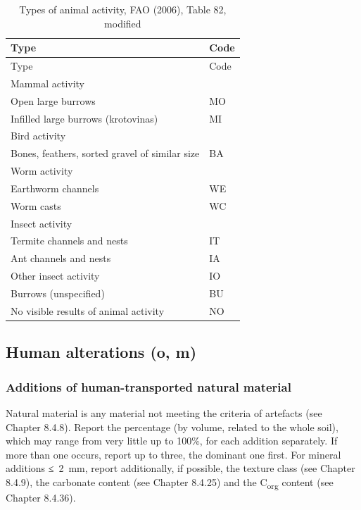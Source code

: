 \documentclass[
  letterpaper,
  DIV=11,
  numbers=noendperiod]{scrreprt}
\begin{document}
\begin{longtable}[]{@{}ll@{}}
\caption{Types of animal activity, FAO (2006), Table 82,
modified}\tabularnewline
\toprule()
Type & Code \\
\midrule()
\endfirsthead
\toprule()
Type & Code \\
\midrule()
\endhead
Mammal activity & \\
Open large burrows & MO \\
Infilled large burrows (krotovinas) & MI \\
Bird activity & \\
Bones, feathers, sorted gravel of similar size & BA \\
Worm activity & \\
Earthworm channels & WE \\
Worm casts & WC \\
Insect activity & \\
Termite channels and nests & IT \\
Ant channels and nests & IA \\
Other insect activity & IO \\
Burrows (unspecified) & BU \\
No visible results of animal activity & NO \\
\bottomrule()
\end{longtable}

\hypertarget{human-alterations-o-m}{%
\subsection{Human alterations (o, m)}\label{human-alterations-o-m}}

\hypertarget{additions-of-human-transported-natural-material}{%
\subsubsection{Additions of human-transported natural
material}\label{additions-of-human-transported-natural-material}}

Natural material is any material not meeting the criteria of artefacts
(see Chapter 8.4.8). Report the percentage (by volume, related to the
whole soil), which may range from very little up to 100\%, for each
addition separately. If more than one occurs, report up to three, the
dominant one first. For mineral additions ≤~2~mm, report additionally,
if possible, the texture class (see Chapter 8.4.9), the carbonate
content (see Chapter 8.4.25) and the C\textsubscript{org} content (see
Chapter 8.4.36).
\end{document}
